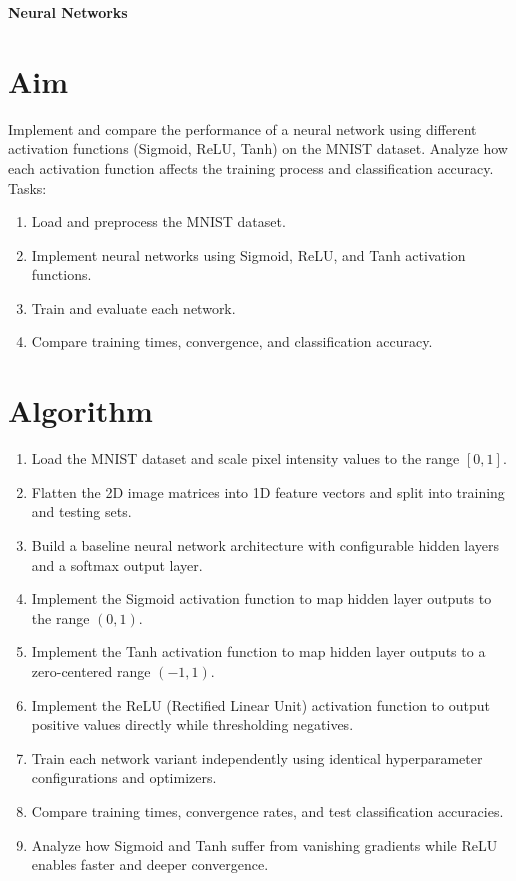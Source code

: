 \documentclass[12pt, a4paper]{report}
\begin{document}
\label{exp:13}
\begin{center}
	{\bfseries \Huge Neural Networks}	
\end{center}

\section*{Aim} 
Implement and compare the performance of a neural network using different activation functions (Sigmoid, ReLU,
Tanh) on the MNIST dataset. Analyze how each activation function affects the training process and classification
accuracy.\\
Tasks:
\begin{enumerate}[\quad -]
	\itemsep 0em 
	
	\item Load and preprocess the MNIST dataset.
	\item Implement neural networks using Sigmoid, ReLU, and Tanh activation functions.
	\item Train and evaluate each network.
	\item Compare training times, convergence, and classification accuracy.
	
\end{enumerate}


\section*{Algorithm} 
\begin{enumerate}
	\item Load the MNIST dataset and scale pixel intensity values to the range $[0, 1]$.
	\item Flatten the 2D image matrices into 1D feature vectors and split into training and testing sets.
	\item Build a baseline neural network architecture with configurable hidden layers and a softmax output layer.
	\item Implement the Sigmoid activation function to map hidden layer outputs to the range $(0, 1)$.
	\item Implement the Tanh activation function to map hidden layer outputs to a zero-centered range $(-1, 1)$.
	\item Implement the ReLU (Rectified Linear Unit) activation function to output positive values directly while thresholding negatives.
	\item Train each network variant independently using identical hyperparameter configurations and optimizers.
	\item Compare training times, convergence rates, and test classification accuracies.
	\item Analyze how Sigmoid and Tanh suffer from vanishing gradients while ReLU enables faster and deeper convergence.
\end{enumerate}
\end{document}
